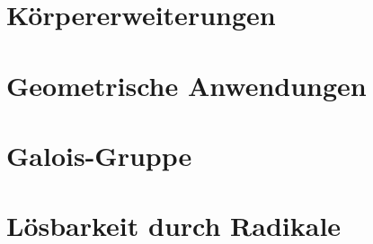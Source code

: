 %
%
%
 




\section{Körpererweiterungen}

\section{Geometrische Anwendungen}

\section{Galois-Gruppe}

\section{Lösbarkeit durch Radikale}

